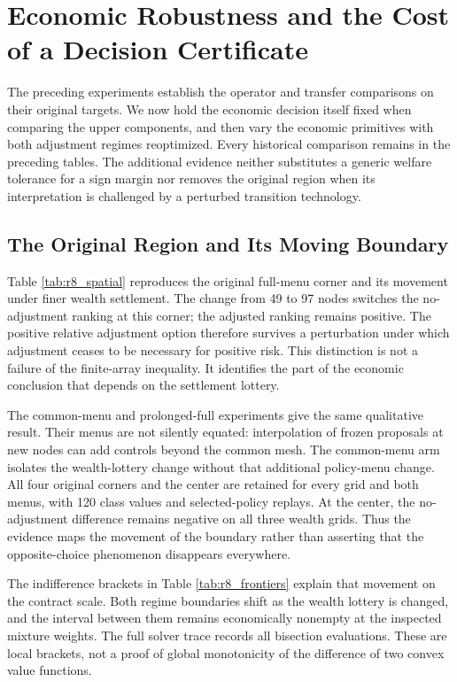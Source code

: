 \section{Economic Robustness and the Cost of a Decision Certificate}
\label{sec:r8_evidence}
The preceding experiments establish the operator and transfer comparisons on their original targets. We now hold the economic decision itself fixed when comparing the upper components, and then vary the economic primitives with both adjustment regimes reoptimized. Every historical comparison remains in the preceding tables. The additional evidence neither substitutes a generic welfare tolerance for a sign margin nor removes the original region when its interpretation is challenged by a perturbed transition technology.

\subsection{The Original Region and Its Moving Boundary}

Table \ref{tab:r8_spatial} reproduces the original full-menu corner and its movement under finer wealth settlement. The change from 49 to 97 nodes switches the no-adjustment ranking at this corner; the adjusted ranking remains positive. The positive relative adjustment option therefore survives a perturbation under which adjustment ceases to be necessary for positive risk. This distinction is not a failure of the finite-array inequality. It identifies the part of the economic conclusion that depends on the settlement lottery.

The common-menu and prolonged-full experiments give the same qualitative result. Their menus are not silently equated: interpolation of frozen proposals at new nodes can add controls beyond the common mesh. The common-menu arm isolates the wealth-lottery change without that additional policy-menu change. All four original corners and the center are retained for every grid and both menus, with 120 class values and selected-policy replays. At the center, the no-adjustment difference remains negative on all three wealth grids. Thus the evidence maps the movement of the boundary rather than asserting that the opposite-choice phenomenon disappears everywhere.


The indifference brackets in Table \ref{tab:r8_frontiers} explain that movement on the contract scale. Both regime boundaries shift as the wealth lottery is changed, and the interval between them remains economically nonempty at the inspected mixture weights. The full solver trace records all bisection evaluations. These are local brackets, not a proof of global monotonicity of the difference of two convex value functions.

